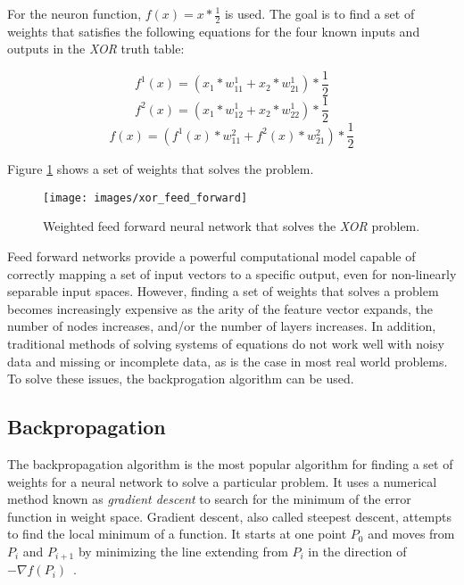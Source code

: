For the neuron function, $f(x) = x * \frac{1}{2}$ is used.
The goal is to find a set of weights that satisfies the following
equations for the four known inputs and outputs in the {\it XOR} truth
table:

\begin{displaymath}
f^1(x) = (x_1 * w_{11}^1 + x_2 * w_{21}^1) * \frac{1}{2}
\end{displaymath}
\begin{displaymath}
f^2(x) = (x_1 * w_{12}^1 + x_2 * w_{22}^1) * \frac{1}{2}
\end{displaymath}
\begin{displaymath}
f(x) = (f^1(x) * w_{11}^2 + f^2(x) * w_{21}^2) * \frac{1}{2}
\end{displaymath}

Figure \ref{xff} shows a set of weights that solves the problem.

\begin{figure}[htb!]
  \centering
  \texttt{[image: images/xor\_feed\_forward]}
  \caption{Weighted feed forward neural network that solves the {\it XOR}
    problem.}
  \label{xff}
\end{figure}

Feed forward networks provide a powerful computational model capable
of correctly mapping a set of input vectors to a specific output, even
for non-linearly separable input spaces.
However, finding a set of weights that solves a problem becomes increasingly expensive as the arity of the feature
vector expands, the number of nodes increases, and/or the number of layers
increases.
In addition, traditional methods of solving systems of equations do not work
well with noisy data and missing or incomplete data, as is the case in most real world problems.
To solve these issues, the backprogation algorithm can be used.

\subsection{Backpropagation}

The backpropagation algorithm is the most popular algorithm for
finding a set of weights for a neural network to solve a particular
problem.
It uses a numerical method known as {\it gradient descent} to search
for the minimum of the error function in weight space.
Gradient descent, also called steepest descent, attempts to find the
local minimum of a function.
It starts at one point $P_0$ and moves from $P_i$ and $P_{i+1}$ by
minimizing the line extending from $P_i$ in the direction of $- \nabla
f(P_i)$~\cite{gradient}.

